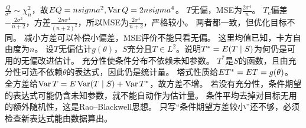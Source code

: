 {$\frac{Q}{\sigma^2}\sim\chi_n^2$，故$E Q=nsigma^2,\operatorname{Var} Q=2nsigma^4$。
$T$无偏，MSE为$\frac{2\sigma^4}{n}$。
$T_c$偏差$-\frac{2\sigma^2}{n+2}$，方差$\frac{2n\sigma^4}{(n+2)^2}$，所以MSE为$\frac{2\sigma^4}{n+2}$，严格较小。
两者都一致，但优化目标不同。}
{减小方差可以补偿小偏差，MSE评价不能只看无偏。}
{这里均值已知，卡方自由度为$n$。}
{设$T$无偏估计$g(\theta)$，$S$充分且$T\in L^2$。说明$T^*=E(T\mid S)$为何仍是可用的无偏改进估计。}
{充分性使条件分布不依赖未知参数。}
{$T^*$是$S$的函数，且由充分性可选不依赖$\theta$的表达式，因此仍是统计量。
塔式性质给$E T^*=E T=g(\theta)$。
全方差给$\operatorname{Var} T=E\operatorname{Var}(T\mid S)+\operatorname{Var} T^*$，故方差不增。
若没有充分性，条件期望的表达式可能仍含未知参数，就不能自动作为估计量。}
{条件平均去掉对目标无用的额外随机性，这是Rao--Blackwell思想。}
{只写“条件期望方差较小”还不够，必须检查新表达式能由数据算出。}

